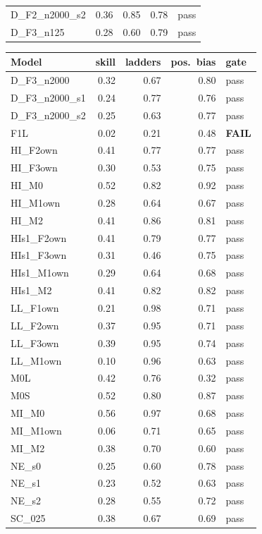 \begin{table}[h]
\begin{minipage}[t]{0.48\linewidth}
\begin{tabular}{lrrrl}
D\_F2\_n2000\_s2 & 0.36 & 0.85 & 0.78 & pass\\
D\_F3\_n125 & 0.28 & 0.60 & 0.79 & pass\\
\bottomrule\end{tabular}
\end{minipage}\hfill
\begin{minipage}[t]{0.48\linewidth}\centering
\begin{tabular}{lrrrl}\toprule Model & skill & ladders & pos.\ bias & gate\\\midrule
D\_F3\_n2000 & 0.32 & 0.67 & 0.80 & pass\\
D\_F3\_n2000\_s1 & 0.24 & 0.77 & 0.76 & pass\\
D\_F3\_n2000\_s2 & 0.25 & 0.63 & 0.77 & pass\\
F1L & 0.02 & 0.21 & 0.48 & \textbf{FAIL}\\
HI\_F2own & 0.41 & 0.77 & 0.77 & pass\\
HI\_F3own & 0.30 & 0.53 & 0.75 & pass\\
HI\_M0 & 0.52 & 0.82 & 0.92 & pass\\
HI\_M1own & 0.28 & 0.64 & 0.67 & pass\\
HI\_M2 & 0.41 & 0.86 & 0.81 & pass\\
HIs1\_F2own & 0.41 & 0.79 & 0.77 & pass\\
HIs1\_F3own & 0.31 & 0.46 & 0.75 & pass\\
HIs1\_M1own & 0.29 & 0.64 & 0.68 & pass\\
HIs1\_M2 & 0.41 & 0.82 & 0.82 & pass\\
LL\_F1own & 0.21 & 0.98 & 0.71 & pass\\
LL\_F2own & 0.37 & 0.95 & 0.71 & pass\\
LL\_F3own & 0.39 & 0.95 & 0.74 & pass\\
LL\_M1own & 0.10 & 0.96 & 0.63 & pass\\
M0L & 0.42 & 0.76 & 0.32 & pass\\
M0S & 0.52 & 0.80 & 0.87 & pass\\
MI\_M0 & 0.56 & 0.97 & 0.68 & pass\\
MI\_M1own & 0.06 & 0.71 & 0.65 & pass\\
MI\_M2 & 0.38 & 0.70 & 0.60 & pass\\
NE\_s0 & 0.25 & 0.60 & 0.78 & pass\\
NE\_s1 & 0.23 & 0.52 & 0.63 & pass\\
NE\_s2 & 0.28 & 0.55 & 0.72 & pass\\
SC\_025 & 0.38 & 0.67 & 0.69 & pass\\

\end{tabular}
\end{minipage}
\end{table}
